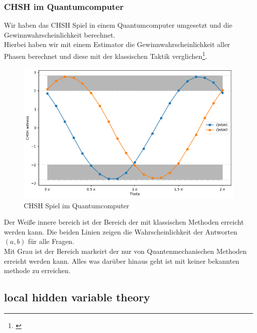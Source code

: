 \subsubsection{CHSH im Quantumcomputer}
\label{subsubsec:chsh_quantumcomputer}
Wir haben das CHSH Spiel in einem Quantumcomputer umgesetzt und die Gewinnwahrscheinlichkeit berechnet.\\
Hierbei haben wir mit einem Estimator die Gewinnwahrscheinlichkeit aller Phasen berechnet und diese mit der klassischen Taktik verglichen\footnote{\cite{IBM_chsh_2025}}.

\begin{figure}[H]
    \centering
    \includegraphics[width=0.8\linewidth]{img/CHSH-Output.png}
    \caption{CHSH Spiel im Quantumcomputer}
    \label{fig:CHSHQuantum}
\end{figure}

Der Weiße innere bereich ist der Bereich der mit klassischen Methoden erreicht werden kann.
Die beiden Linien zeigen die Wahrscheinlichkeit der Antworten $(a, b)$ für alle Fragen.\\
Mit Grau ist der Bereich markeirt der nur von Quantenmechanischen Methoden erreicht werden kann. Alles was darüber hinaus geht ist mit keiner bekannten methode zu erreichen.\\




\subsection{local hidden variable theory}
\label{subsec:chsh_lhvt}